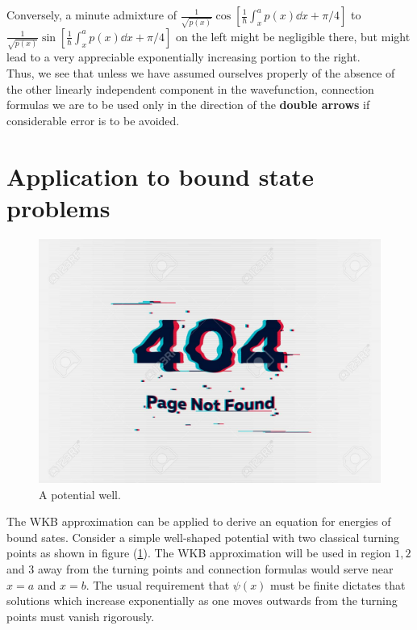 Conversely, a minute admixture of 
$\frac{1}{\sqrt{p(x)}} \cos[\frac{1}{\hbar}\int_{x}^{a} p(x) \dd{x} + \pi/4]$
to
$\frac{1}{\sqrt{p(x)}} \sin[\frac{1}{\hbar}\int_{x}^{a} p(x) \dd{x} + \pi/4]$
on the left might be negligible there, but might lead to a very appreciable exponentially increasing portion to the right.\\

Thus, we see that unless we have assumed ourselves properly of the absence  of the other linearly independent component in the wavefunction, connection formulas we are to be used only in the direction of the \textbf{double arrows} if considerable error is to be avoided.


\section{Application to bound state problems}
\begin{figure}
	\centering
	\includegraphics[width=0.5\linewidth]{Pictures/not-found.jpg}
	\caption{A potential well.}
	\label{chapter22.fig4}
\end{figure}

The WKB approximation can be applied to derive an equation for energies of bound sates. Consider a simple well-shaped potential with two classical turning points as shown in figure (\ref{chapter22.fig4}). The WKB approximation will be used in region $1,2$ and $3$ away from the turning points and connection formulas would serve near $x=a$ and $x=b$. The usual requirement that $\psi(x)$ must be finite dictates that solutions which increase exponentially as one moves outwards from the turning points must vanish rigorously.\\


